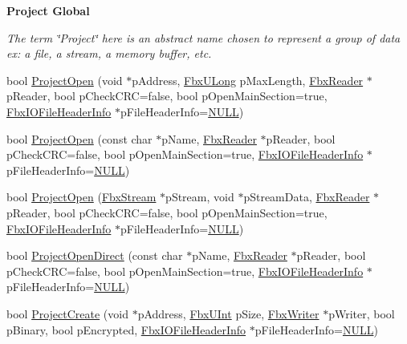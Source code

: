 \begin{Indent}\textbf{ Project Global}\par
{\em The term \char`\"{}\+Project\char`\"{} here is an abstract name chosen to represent a group of data ex\+: a file, a stream, a memory buffer, etc. }\begin{DoxyCompactItemize}
\item 
bool \hyperlink{class_fbx_i_o_a767b2b322e766773191b7065d8499d33}{Project\+Open} (void $\ast$p\+Address, \hyperlink{fbxtypes_8h_a90ed25197196e9196d00a150cabec75f}{Fbx\+U\+Long} p\+Max\+Length, \hyperlink{class_fbx_reader}{Fbx\+Reader} $\ast$p\+Reader, bool p\+Check\+C\+RC=false, bool p\+Open\+Main\+Section=true, \hyperlink{class_fbx_i_o_file_header_info}{Fbx\+I\+O\+File\+Header\+Info} $\ast$p\+File\+Header\+Info=\hyperlink{fbxarch_8h_a070d2ce7b6bb7e5c05602aa8c308d0c4}{N\+U\+LL})
\item 
bool \hyperlink{class_fbx_i_o_a8f087bca7c187abb0295eb8fed6cc227}{Project\+Open} (const char $\ast$p\+Name, \hyperlink{class_fbx_reader}{Fbx\+Reader} $\ast$p\+Reader, bool p\+Check\+C\+RC=false, bool p\+Open\+Main\+Section=true, \hyperlink{class_fbx_i_o_file_header_info}{Fbx\+I\+O\+File\+Header\+Info} $\ast$p\+File\+Header\+Info=\hyperlink{fbxarch_8h_a070d2ce7b6bb7e5c05602aa8c308d0c4}{N\+U\+LL})
\item 
bool \hyperlink{class_fbx_i_o_ab6b83692c707db5eb59f6023e87a0bad}{Project\+Open} (\hyperlink{class_fbx_stream}{Fbx\+Stream} $\ast$p\+Stream, void $\ast$p\+Stream\+Data, \hyperlink{class_fbx_reader}{Fbx\+Reader} $\ast$p\+Reader, bool p\+Check\+C\+RC=false, bool p\+Open\+Main\+Section=true, \hyperlink{class_fbx_i_o_file_header_info}{Fbx\+I\+O\+File\+Header\+Info} $\ast$p\+File\+Header\+Info=\hyperlink{fbxarch_8h_a070d2ce7b6bb7e5c05602aa8c308d0c4}{N\+U\+LL})
\item 
bool \hyperlink{class_fbx_i_o_afa5bbad044b2c4ebe19a6254dac37f33}{Project\+Open\+Direct} (const char $\ast$p\+Name, \hyperlink{class_fbx_reader}{Fbx\+Reader} $\ast$p\+Reader, bool p\+Check\+C\+RC=false, bool p\+Open\+Main\+Section=true, \hyperlink{class_fbx_i_o_file_header_info}{Fbx\+I\+O\+File\+Header\+Info} $\ast$p\+File\+Header\+Info=\hyperlink{fbxarch_8h_a070d2ce7b6bb7e5c05602aa8c308d0c4}{N\+U\+LL})
\item 
bool \hyperlink{class_fbx_i_o_a62a30b300e6b2e14cb893de697a09878}{Project\+Create} (void $\ast$p\+Address, \hyperlink{fbxtypes_8h_ae9fb141d8158a730aa85ec5ff2ea3f6b}{Fbx\+U\+Int} p\+Size, \hyperlink{class_fbx_writer}{Fbx\+Writer} $\ast$p\+Writer, bool p\+Binary, bool p\+Encrypted, \hyperlink{class_fbx_i_o_file_header_info}{Fbx\+I\+O\+File\+Header\+Info} $\ast$p\+File\+Header\+Info=\hyperlink{fbxarch_8h_a070d2ce7b6bb7e5c05602aa8c308d0c4}{N\+U\+LL})

\end{DoxyCompactItemize}
\end{Indent}
